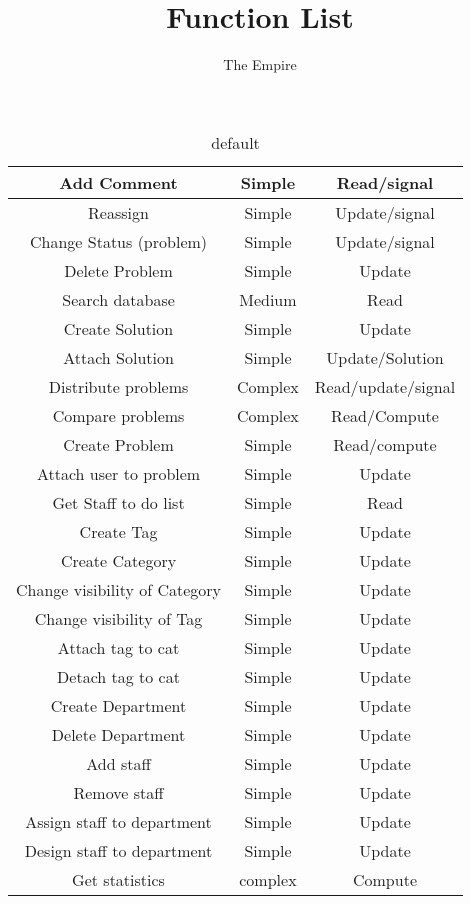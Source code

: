 \documentclass[11pt]{amsart}
\title{Function List}
\author{The Empire}
\begin{document}
\maketitle

\begin{table}[htdp]
\caption{default}
\begin{center}
\begin{tabular}{|c|c|c|}
\hline
Add Comment &   Simple & Read/signal   \\ \hline%
Reassign & Simple   & Update/signal \\ \hline%
Change Status (problem) &   Simple & Update/signal \\ \hline%
Delete Problem & Simple &   Update \\   \hline%
Search database & Medium &   Read \\ \hline%
Create Solution & Simple &   Update \\   \hline%
Attach Solution & Simple &   Update/Solution \\   \hline%
Distribute problems &   Complex & Read/update/signal \\   \hline%
Compare problems & Complex & Read/Compute \\ \hline%
Create Problem &   Simple & Read/compute \\   \hline%
Attach user to problem & Simple & Update \\ \hline%
Get Staff to do list & Simple & Read \\   \hline%
Create Tag & Simple &   Update \\ \hline%
Create Category & Simple & Update \\ \hline%
Change visibility of Category &   Simple &   Update \\   \hline%
Change visibility of Tag &   Simple &  Update \\ \hline%
Attach tag to cat & Simple & Update \\ \hline%
Detach tag to cat & Simple & Update \\ \hline%
Create Department & Simple & Update \\ \hline%
Delete Department & Simple & Update \\ \hline%
Add staff & Simple & Update \\ \hline%
Remove staff & Simple & Update \\ \hline%
Assign staff to department & Simple & Update \\ \hline%
Design staff to department & Simple & Update \\ \hline%
Get statistics & complex & Compute \\ \hline%


\end{tabular}
\end{center}
\end{table}
\end{document}

